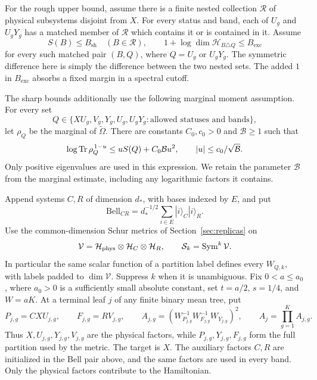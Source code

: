 For the rough upper bound, assume there is a finite nested collection
$\mathcal R$ of physical subsystems disjoint from $X$.  For every status
and band, each of $U_g$ and $U_gY_g$ has a matched member of $\mathcal R$
which contains it or is contained in it.  Assume
\begin{equation}
 S(B)\le B_{\mathrm{sh}}\quad(B\in\mathcal R),
 \qquad 1+\log\dim\mathcal H_{B\triangle Q}\le B_{\mathrm{exc}}
 \label{comparator:prefix-data}
\end{equation}
for every such matched pair $(B,Q)$, where $Q=U_g$ or $U_gY_g$.
The symmetric difference here is simply the difference between the two
nested sets.  The added $1$ in $B_{\mathrm{exc}}$ absorbs a fixed margin
in a spectral cutoff.

The sharp bounds additionally use the following marginal moment assumption.
For every set
\[
 Q\in\{XU_g,V_g,Y_g,U_g,U_gY_g:\text{allowed statuses and bands}\},
\]
let $\rho_Q$ be the marginal of $\widetilde\Omega$.  There are constants
$C_0,c_0>0$ and $\mathcal B\ge1$ such that
\begin{equation}
 \log\operatorname{Tr}\rho_Q^{\,1-u}
 \le uS(Q)+C_0\mathcal B u^2,
 \qquad |u|\le c_0/\sqrt{\mathcal B}.
 \label{comparator:mgf-data}
\end{equation}
Only positive eigenvalues are used in this expression.  We retain the
parameter $\mathcal B$ from the marginal estimate, including any
logarithmic factors it contains.

Append systems $C,R$ of dimension $d_*$, with bases indexed by $E$, and put
\[
 \mathrm{Bell}_{CR}=d_*^{-1/2}\sum_{i\in E}|i\rangle_C|i\rangle_R.
\]
Use the common-dimension Schur metrics of Section~\ref{sec:replicas} on
\[
 \mathcal V=\mathcal H_{\mathrm{phys}}\otimes\mathcal H_C
       \otimes\mathcal H_R,
 \qquad \mathcal S_k=\operatorname{Sym}^k\mathcal V.
\]
In particular the same scalar function of a partition label defines every
$W_{Q,k}$, with labels padded to $\dim\mathcal V$.  Suppress $k$ when it
is unambiguous.  Fix $0<a\le a_0$, where $a_0>0$ is a sufficiently small
absolute constant, set $t=a/2$, $s=1/4$, and $W=aK$.  At a terminal leaf
$j$ of any finite binary mean tree, put
\begin{equation}
 P_{j,g}=CXU_{j,g},\qquad F_{j,g}=RV_{j,g},\qquad
 A_{j,g}=(W_{P_{j,g}}^{-1}W_{F_{j,g}}^{-1}W_{Y_{j,g}})^2,
 \qquad A_j=\prod_{g=1}^K A_{j,g}.
 \label{comparator:metrics}
\end{equation}
Thus $X,U_{j,g},Y_{j,g},V_{j,g}$ are the physical factors, while
$P_{j,g},Y_{j,g},F_{j,g}$ form the full partition used by the metric.
The target is $X$. The auxiliary factors $C,R$ are initialized in
the Bell pair above, and the same factors are used in every band.
Only the physical factors contribute to the Hamiltonian.

